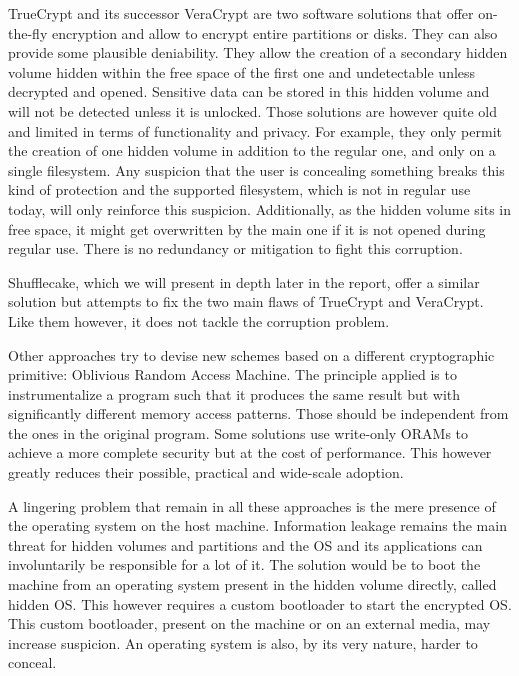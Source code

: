 \documentclass[a4paper,11pt,oneside]{report}
\begin{document}
TrueCrypt\cite{truecrypt} and its successor VeraCrypt\cite{veracrypt} are two software solutions that offer on-the-fly encryption and allow to encrypt entire partitions or disks. They can also provide some plausible deniability. They allow the creation of a secondary hidden volume hidden within the free space of the first one and undetectable unless decrypted and opened. Sensitive data can be stored in this hidden volume and will not be detected unless it is unlocked. Those solutions are however quite old and limited in terms of functionality and privacy. For example, they only permit the creation of one hidden volume in addition to the regular one, and only on a single filesystem. Any suspicion that the user is concealing something breaks this kind of protection and the supported filesystem, which is not in regular use today, will only reinforce this suspicion. Additionally, as the hidden volume sits in free space, it might get overwritten by the main one if it is not opened during regular use. There is no redundancy or mitigation to fight this corruption.

Shufflecake\cite{Anzuoni:297353}, which we will present in depth later in the report, offer a similar solution but attempts to fix the two main flaws of TrueCrypt and VeraCrypt. Like them however, it does not tackle the corruption problem.

Other approaches try to devise new schemes based on a different cryptographic primitive: Oblivious Random Access Machine. The principle applied is to instrumentalize a program such that it produces the same result but with significantly different memory access patterns. Those should be independent from the ones in the original program\cite{oram}. Some solutions use write-only ORAMs\cite{10.1145/2660267.2660313} to achieve a more complete security but at the cost of performance. This however greatly reduces their possible, practical and wide-scale adoption.

A lingering problem that remain in all these approaches is the mere presence of the operating system on the host machine. Information leakage remains the main threat for hidden volumes and partitions and the OS and its applications can involuntarily be responsible for a lot of it\cite{268123}. The solution would be to boot the machine from an operating system present in the hidden volume directly, called hidden OS. This however requires a custom bootloader to start the encrypted OS. This custom bootloader, present on the machine or on an external media, may increase suspicion\cite{000213012}. An operating system is also, by its very nature, harder to conceal\cite{veraOS}.
\end{document}

